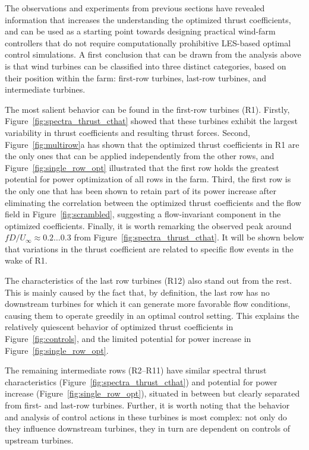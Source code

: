 \documentclass[wes, manuscript]{copernicus}
\begin{document}
The observations and experiments from previous sections have revealed information that increases the understanding the optimized thrust coefficients, and can be used as a starting point towards designing practical wind-farm controllers that do not require computationally prohibitive LES-based optimal control simulations. A first conclusion that can be drawn from the analysis above is that wind turbines can be classified into three distinct categories, based on their position within the farm: first-row turbines, last-row turbines, and intermediate turbines.

The most salient behavior can be found in the first-row turbines (R1). Firstly, Figure~\ref{fig:spectra_thrust_cthat} showed that these turbines exhibit the largest variability in thrust coefficients and resulting thrust forces. Second, Figure~\ref{fig:multirow}a has shown that the optimized thrust coefficients in R1 are the only ones that can be applied independently from the other rows, and Figure~\ref{fig:single_row_opt} illustrated that the first row holds the greatest potential for power optimization of all rows in the farm. Third, the first row is the only one that has been shown to retain part of its power increase after eliminating the correlation between the optimized thrust coefficients and the flow field in Figure~\ref{fig:scrambled}, suggesting a flow-invariant component in the optimized coefficients. Finally, it is worth remarking the observed peak around $fD/U_\infty \approx 0.2 \dots 0.3$ from Figure~\ref{fig:spectra_thrust_cthat}. It will be shown below that variations in the thrust coefficient are related to specific flow events in the wake of R1.

The characteristics of the last row turbines (R12) also stand out from the rest. This is mainly caused by the fact that, by definition, the last row has no downstream turbines for which it can generate more favorable flow conditions, causing them to operate greedily in an optimal control setting. This explains the relatively quiescent behavior of optimized thrust coefficients in Figure~\ref{fig:controls}, and the limited potential for power increase in Figure~\ref{fig:single_row_opt}. 

The remaining intermediate rows (R2--R11) have similar spectral thrust characteristics (Figure~\ref{fig:spectra_thrust_cthat}) and potential for power increase (Figure~\ref{fig:single_row_opt}), situated in between but clearly separated from first- and last-row turbines. Further, it is worth noting that the behavior and analysis of control actions in these turbines is most complex: not only do they influence downstream turbines, they in turn are dependent on controls of upstream turbines. 
\end{document}
